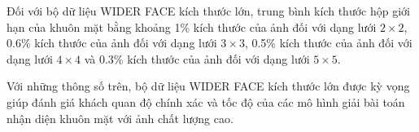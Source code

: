 {    \noindent
    Đối với bộ dữ liệu WIDER FACE kích thước lớn, trung bình kích thước hộp giới hạn của khuôn mặt bằng khoảng 1\% kích thước của ảnh đối với dạng lưới $2 \times 2$, 0.6\% kích thước của ảnh đối với dạng lưới $3 \times 3$, 0.5\% kích thước của ảnh đối với dạng lưới $4 \times 4$ và 0.3\% kích thước của ảnh đối với dạng lưới $5 \times 5$.

    \noindent
    Với những thông số trên, bộ dữ liệu WIDER FACE kích thước lớn được kỳ vọng giúp đánh giá khách quan độ chính xác và tốc độ của các mô hình giải bài toán nhận diện khuôn mặt với ảnh chất lượng cao.
}